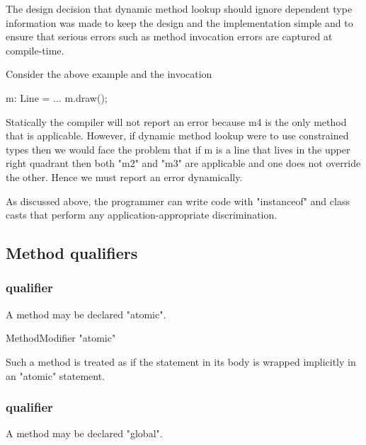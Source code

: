 \begin{rationale}
  The design decision that dynamic method lookup should ignore
  dependent type information was made to keep the design and the
  implementation simple and to ensure that serious errors such as
  method invocation errors are captured at compile-time.
 
  Consider the above example and the invocation
\begin{xten}
m: Line = ...
m.draw();    
\end{xten}


   Statically the compiler will not report an error because m4 is the
   only method that is applicable. However, if dynamic method lookup
   were to use constrained types then we would face the problem that if m is a
   line that lives in the upper right quadrant then both \xcd"m2"
   and \xcd"m3"
   are applicable and one does not override the other. Hence we must
   report an error dynamically.

   As discussed above, the programmer can write code with \xcd"instanceof"
   and class casts that perform any application-appropriate
   discrimination.  
\end{rationale}

\subsection{Method qualifiers}
\label{MethodQualifier}

\subsubsection{ qualifier}
\label{AtomicAnnotation}

A method may be declared \xcd"atomic".

\begin{grammar}
  MethodModifier \: \xcd"atomic"  
\end{grammar}

Such a method is treated as if the statement in its body is wrapped 
implicitly in an \xcd"atomic" statement.

\subsubsection{ qualifier}
\label{LocalAnnotation}
\label{GlobalMethod}

A method may be declared \xcd"global".

